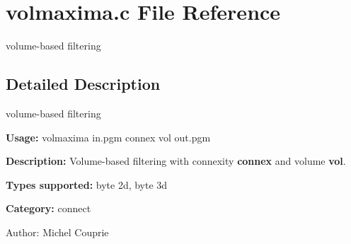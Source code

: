 \section{volmaxima.c File Reference}
\label{volmaxima_8c}
volume-based filtering  




\label{_details}
\subsection{Detailed Description}
volume-based filtering 

{\bf Usage:} volmaxima in.pgm connex vol out.pgm

{\bf Description:} Volume-based filtering with connexity {\bf connex} and volume {\bf vol}.

{\bf Types supported:} byte 2d, byte 3d

{\bf Category:} connect

\begin{Desc}
\item[Author:]Michel Couprie \end{Desc}
